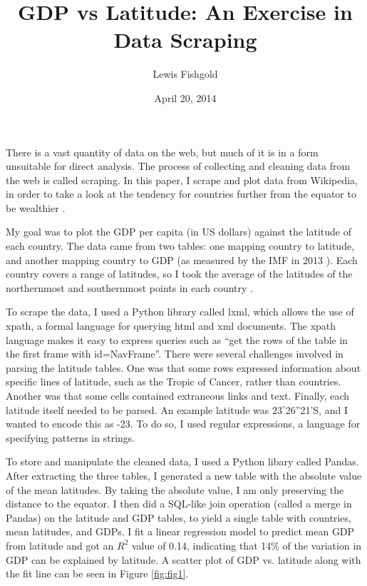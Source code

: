 \documentclass{article}
\begin{document}
\title{GDP vs Latitude: An Exercise in Data Scraping}
\author{Lewis Fishgold}
\date{April 20, 2014}
\maketitle

There is a vast quantity of data on the web, but much of it is in a form unsuitable for direct analysis.
 The process of collecting and cleaning data from the web is called scraping. 
In this paper, I scrape and plot data from Wikipedia, in order to take a look at the tendency for countries further from the equator to be wealthier \cite{wiki-geo-wealth}.

My goal was to plot the GDP per capita (in US dollars) against the latitude of each country.
The data came from two tables: one mapping country to latitude, and another mapping country to GDP (as measured by the IMF in 2013 \cite{wiki-gdp}).
Each country covers a range of latitudes, so I took the average of the 
latitudes of the northernmost and southernmost points in each country 
 \cite{wiki-north-lat, wiki-south-lat}.

To scrape the data, I used a Python library called {\sc lxml}, which allows the use of {\sc xpath}, a formal language for querying {\sc html} and {\sc xml} documents. 
The {\sc xpath} language makes it easy to express queries such as ``get the rows of the table in the first frame with id=NavFrame''.
There were several challenges involved in parsing the latitude tables.
One was that some rows expressed information about specific lines of latitude, such as the Tropic of Cancer, rather than countries.
Another was that some cells contained extraneous links and text.
Finally, each latitude itself needed to be parsed. 
An example latitude was $23^\circ$26''21'S, and I wanted to encode this as -23.
To do so, I used regular expressions, a language for specifying patterns in strings.

To store and manipulate the cleaned data, I used a Python libary called Pandas.
After extracting the three tables, I generated a new table with the absolute value of the mean latitudes.
By taking the absolute value, I am only preserving the distance to the equator.
I then did a SQL-like join operation (called a merge in Pandas) 
on the latitude and GDP tables, 
 to yield a single table with countries, mean latitudes, and GDPs. 
 I fit a linear regression model to predict mean GDP from latitude and got an 
 $R^2$ value of 0.14, indicating that 14\% of the variation in GDP can be 
 explained by latitude.
A scatter plot of GDP vs. latitude along with the fit line can be seen in Figure \ref{fig:fig1}.
\end{document}
